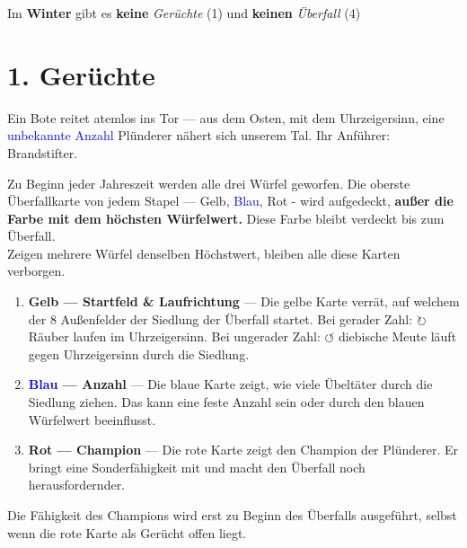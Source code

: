 \documentclass[11pt]{article}
\begin{document}
\begin{lumenpage}
\begin{lumeninfo}
Im \textbf{Winter} gibt es \textbf{keine} \textit{Gerüchte} (1) und \textbf{keinen} \textit{Überfall} (4)
\end{lumeninfo}

\chapter{1. Gerüchte}

\begin{lumenquote}
Ein Bote reitet atemlos ins Tor — aus dem \textcolor{LumenGold}{Osten}, mit dem Uhrzeigersinn, eine \textcolor{blue}{unbekannte Anzahl} Plünderer nähert sich unserem Tal. Ihr \textcolor{LumenClayDark}{Anführer}: Brandstifter.
\end{lumenquote}

Zu Beginn jeder Jahreszeit werden alle drei Würfel geworfen.
Die oberste Überfallkarte von jedem Stapel --- \textcolor{LumenGold}{Gelb}, \textcolor{blue}{Blau}, \textcolor{LumenClayDark}{Rot} - wird aufgedeckt,\textbf{ außer die Farbe mit dem höchsten Würfelwert.} Diese Farbe bleibt verdeckt bis zum Überfall.\\
Zeigen mehrere Würfel denselben Höchstwert, bleiben alle diese Karten verborgen.

\begin{enumerate}
\item \textbf{\textcolor{LumenGold}{Gelb} — Startfeld \& Laufrichtung} --- Die gelbe Karte verrät, auf welchem der 8 Außenfelder der Siedlung der Überfall startet. Bei gerader Zahl: $\circlearrowright$ Räuber laufen im Uhrzeigersinn. Bei ungerader Zahl: $\circlearrowleft$ diebische Meute läuft gegen Uhrzeigersinn durch die Siedlung.
\item \textbf{\textcolor{blue}{Blau} — Anzahl} --- Die blaue Karte zeigt, wie viele Übeltäter durch die Siedlung ziehen. Das kann eine feste Anzahl sein oder durch den blauen Würfelwert beeinflusst.
\item \textbf{\textcolor{LumenClayDark}{Rot} — Champion} --- Die rote Karte zeigt den Champion der Plünderer. Er bringt eine Sonderfähigkeit mit und macht den Überfall noch herausfordernder.
\end{enumerate}

\begin{lumenwarning}
Die Fähigkeit des Champions wird erst zu Beginn des Überfalls ausgeführt, selbst wenn die rote Karte als Gerücht offen liegt.
\end{lumenwarning}


\end{lumenpage}
\end{document}
